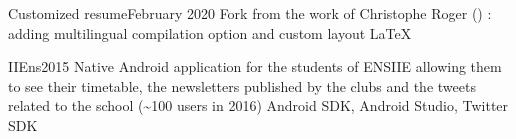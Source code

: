 %
%
%


\begin{projects}

    \project
    {Customized resume}{February 2020}
    {}
    {Fork from the work of Christophe Roger () : adding multilingual compilation option and custom layout}
    {\LaTeX}
    
	\project
	{IIEns}{2015}
	{}
	{Native Android application for the students of ENSIIE allowing them to see their timetable, the newsletters published by the clubs and the tweets related to the school (\textasciitilde100 users in 2016)}
	{Android SDK, Android Studio, Twitter SDK}

\end{projects}